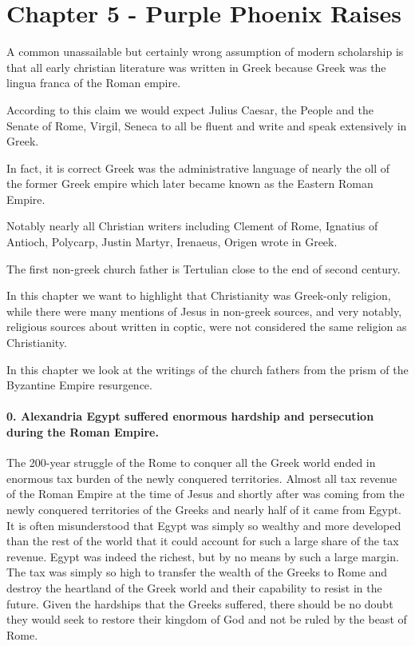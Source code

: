\section{Chapter 5 - Purple Phoenix Raises}\label{par:chapter-5---purple-phoenix-raises}

A common unassailable but certainly wrong assumption of modern scholarship is that all early christian literature was written in Greek because Greek was the lingua franca of the Roman empire.

According to this claim we would expect Julius Caesar, the People and the Senate of Rome, Virgil, Seneca to all be fluent and write and speak extensively in Greek.

In fact, it is correct Greek was the administrative language of nearly the oll of the former Greek empire which later became known as the Eastern Roman Empire.

Notably nearly all Christian writers including Clement of Rome, Ignatius of Antioch, Polycarp, Justin Martyr, Irenaeus, Origen wrote in Greek.

The first non-greek church father is Tertulian close to the end of second century.

In this chapter we want to highlight that Christianity was Greek-only religion, while there were many mentions of Jesus in non-greek sources, and very notably, religious sources about written in coptic, were not considered the same religion as Christianity.

In this chapter we look at the writings of the church fathers from the prism of the Byzantine Empire resurgence.

\paragraph{0.
Alexandria Egypt suffered enormous hardship and persecution during the Roman Empire.}\label{par:alexandria-egypt-suffered-enormous-hardship-and-persecution-during-the-roman-empire.}

The 200-year struggle of the Rome to conquer all the Greek world ended in enormous tax burden of the newly conquered territories.
Almost all tax revenue of the Roman Empire at the time of Jesus and shortly after was coming from the newly conquered territories of the Greeks and nearly half of it came from Egypt.
It is often misunderstood that Egypt was simply so wealthy and more developed than the rest of the world that it could account for such a large share of the tax revenue.
Egypt was indeed the richest, but by no means by such a large margin.
The tax was simply so high to transfer the wealth of the Greeks to Rome and destroy the heartland of the Greek world and their capability to resist in the future.
Given the hardships that the Greeks suffered, there should be no doubt they would seek to restore their kingdom of God and not be ruled by the beast of Rome.

